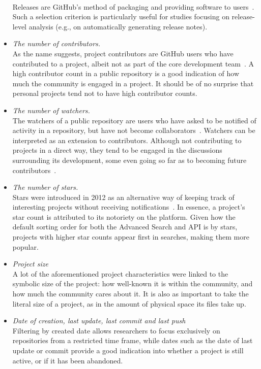 \begin{itemize}
    \\Releases are GitHub's method of packaging and providing software to users~\cite{GITHUBHELP}. Such a selection criterion is particularly useful for studies focusing on release-level analysis (e.g., on automatically generating release notes).
    \item \textit{The number of contributors.}
    \\As the name suggests, project contributors are GitHub users who have contributed to a project, albeit not as part of the core development team~\cite{GITHUBHELP}. A high contributor count in a public repository is a good indication of how much the community is engaged in a project. It should be of no surprise that personal projects tend not to have high contributor counts.
    \item \textit{The number of watchers.}
    \\The watchers of a public repository are users who have asked to be notified of activity in a repository, but have not become collaborators~\cite{METRICSWATCHERS}. Watchers can be interpreted as an extension to contributors. Although not contributing to projects in a direct way, they tend to be engaged in the discussions surrounding its development, some even going so far as to becoming future contributors~\cite{WATCHERS14}.
    \item \textit{The number of stars.}
    \\Stars were introduced in 2012 as an alternative way of keeping track of interesting projects without receiving notifications~\cite{STARS}. In essence, a project's star count is attributed to its notoriety on the platform. Given how the default sorting order for both the Advanced Search and API is by stars, projects with higher star counts appear first in searches, making them more popular.
    \item \textit{Project size}
    \\A lot of the aforementioned project characteristics were linked to the symbolic size of the project: how well-known it is within the community, and how much the community cares about it. It is also as important to take the literal size of a project, as in the amount of physical space its files take up.
    \item \textit{Date of creation, last update, last commit and last push}
    \\Filtering by created date allows researchers to focus exclusively on repositories from a restricted time frame, while dates such as the date of last update or commit provide a good indication into whether a project is still active, or if it has been abandoned.

\end{itemize}
